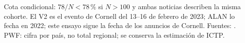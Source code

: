 \begin{table}[!ht]
\begin{threeparttable}
\caption{Inscripción y actividad reportada. Los cocientes no son medidas equivalentes de aprendizaje ni de finalización.}\label{tab:participacion}

\begin{tablenotes}[flushleft]
\item[*] Cota condicional: $78/N<78\,\%$ si $N>100$ y ambas noticias describen la misma cohorte. El V2 es el evento de Cornell del 13--16 de febrero de 2023; ALAN lo fecha en 2022; este ensayo sigue la fecha de los anuncios de Cornell. Fuentes: \cite{salud,cornell,coafina2022,coafina2023pre,coafina,coafina2024,pwf2016}. PWF: cifra por país, no total regional; se conserva la estimación de ICTP.
\end{tablenotes}
\end{threeparttable}
\end{table}
